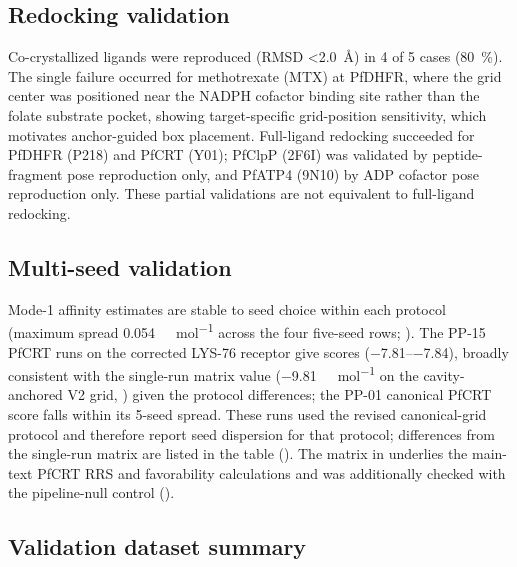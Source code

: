 \documentclass[11pt,a4paper]{article}
\begin{document}
	\subsection{Redocking validation}\label{sec:sm_val_redock}
	
	
	Co-crystallized ligands were reproduced (RMSD \qty{<2.0}{\angstrom}) in \num{4} of \num{5} cases (\qty{80}{\percent}). The single failure occurred for methotrexate (MTX) at PfDHFR, where the grid center was positioned near the NADPH cofactor binding site rather than the folate substrate pocket, showing target-specific grid-position sensitivity, which motivates anchor-guided box placement. Full-ligand redocking succeeded for PfDHFR (P218) and PfCRT (Y01); PfClpP (2F6I) was validated by peptide-fragment pose reproduction only, and PfATP4 (9N10) by ADP cofactor pose reproduction only. These partial validations are not equivalent to full-ligand redocking.
	
	\subsection{Multi-seed validation}\label{sec:sm_val_multiseed}
	
	
	Mode-1 affinity estimates are stable to seed choice within each protocol (maximum spread \num{0.054}~\si{\kilo\calorie\per\mol} across the four five-seed rows; ). The PP-15 PfCRT runs on the corrected LYS-76 receptor give scores (\numrange{-7.81}{-7.84}), broadly consistent with the single-run matrix value (\num{-9.81}~\si{\kilo\calorie\per\mol} on the cavity-anchored V2 grid, ) given the protocol differences; the PP-01 canonical PfCRT score falls within its \num{5}-seed spread. These runs used the revised canonical-grid protocol and therefore report seed dispersion for that protocol; differences from the single-run matrix are listed in the table (). The matrix in  underlies the main-text PfCRT RRS and favorability calculations and was additionally checked with the pipeline-null control ().
	
	\subsection{Validation dataset summary}\label{sec:sm_val_datasets}
	
	
\end{document}
